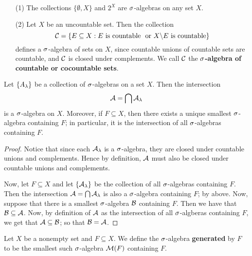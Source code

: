 \begin{example}\label{example_8.1}
    \begin{enumerate}
        \item[(1)] The collections $\{\emptyset, X\}$ and $2^X$ are
            $\sigma$-algebras on any set $X$.

        \item[(2)] Let $X$ be an uncountable set. Then the collection
            \begin{equation*}
                \mathcal{C}=\{E \subseteq X : E \text{ is countable } \text{ or }
                X \backslash E \text{ is countable}\}
            \end{equation*}
            defines a $\sigma$-algebra of sets on $X$, since countable unions of
            countable sets are countable, and $\mathcal{C}$ is closed under complements.
            We call $\mathcal{C}$ the \textbf{$\sigma$-algebra of countable or cocountable
            sets}.
    \end{enumerate}
\end{example}

\begin{lemma}\label{8.1.3}
    Let $\{A_\lambda\}$ be a collection of $\sigma$-algebras on a set  $X$. Then the
    intersection
    \begin{equation*}
        \mathcal{A}=\bigcap{\mathcal{A}_\lambda}
    \end{equation*}
    is a $\sigma$-algebra on $X$. Moreover, if $F \subseteq X$, then there exists a
    unique smallest $\sigma$-algebra containing $F$; in particular, it is the
    intersection of all  $\sigma$-algebras containing  $F$.
\end{lemma}
\begin{proof}
    Notice that since each $\mathcal{A}_\lambda$ is a  $\sigma$-algebra, they are closed under
    countable unions and complements. Hence by definition,  $\mathcal{A}$ must also be
    closed under countable unions and complements.

    Now, let $F \subseteq X$ and let $\{\mathcal{A}_\lambda\}$ be the collection of all
    $\sigma$-algebras containing $F$. Then the intersection $\mathcal{A}=\bigcap{\mathcal{A}_\lambda}$ is
    also a $\sigma$-algebra containing  $F$; by above. Now, suppose that there is a
    smallest $\sigma$-algebra $\mathcal{B}$ containing $F$. Then we have that $\mathcal{B} \subseteq
    \mathcal{A}$. Now, by definition of  $\mathcal{A}$ as the intersection of all  $\sigma$-algberas
    containing  $F$, we get that  $\mathcal{A} \subseteq \mathcal{B}$; so that $\mathcal{B}=\mathcal{A}$.
\end{proof}

\begin{definition}
    Let $X$ be a nonempty set and  $F \subseteq X$. We define the $\sigma$-algebra
    \textbf{generated} by $F$ to be the smallest such $\sigma$-algebra $\mathcal{M}(F)$
    containing $F$.
\end{definition}

